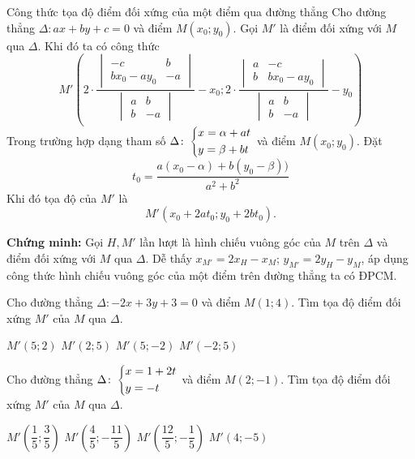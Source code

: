 \begin{dang}{Công thức tọa độ điểm đối xứng của một điểm qua đường thẳng}
Cho đường thẳng $\Delta \colon ax+by+c=0$ và điểm $M\left (x_0;y_0\right )$. Gọi $M'$ là điểm đối xứng với $M$  qua $\Delta$. Khi đó ta có công thức \[M' \left( 2 \cdot \dfrac{\begin{vmatrix}
-c & b  \\ 
bx_0-ay_0 & -a 
\end{vmatrix}}{\begin{vmatrix}
a & b  \\ 
b & -a 
\end{vmatrix}} -x_0; 2 \cdot \dfrac{\begin{vmatrix}
a & -c  \\ 
b & bx_0-ay_0
\end{vmatrix}}{\begin{vmatrix}
a & b  \\ 
b & -a 
\end{vmatrix}} -y_0\right)\]
Trong trường hợp dạng tham số $\Delta \colon \left\{\begin{aligned}&x=\alpha + at\\&y=\beta +bt\end{aligned}\right.$ và điểm $M\left (x_0;y_0\right )$. Đặt \[t_0 =\dfrac{a(x_0-\alpha) + b(y_0-\beta))}{a^2+b^2}\] 
Khi đó tọa độ của $M'$ là 
\[ M'(x_0+2at_0; y_0+2bt_0).\]
\end{dang}
\noindent \textbf{Chứng minh:} Gọi $H,M'$ lần lượt là hình chiếu vuông góc của $M$ trên $\Delta$  và điểm đối xứng với $M$ qua $\Delta$. Dễ thấy $x_{M'} = 2x_H-x_M$; $y_{M'} = 2y_H-y_M$, áp dụng công thức hình chiếu vuông góc của một điểm trên đường thẳng ta có ĐPCM. 

\begin{vd}%
Cho đường thẳng $\Delta \colon -2x+3y+3=0$ và điểm $M(1;4)$. Tìm tọa độ điểm đối xứng $M'$ của $M$ qua $\Delta.$

\choice
{$M'(5;2)$}
{$M'(2;5)$}
{\True $M'(5;-2)$}
{$M'(-2;5)$}
\end{vd}

\begin{vd}%
Cho đường thẳng $\Delta \colon \left\{\begin{aligned}&x=1+2t\\&y=-t\end{aligned}\right.$ và điểm $M(2;-1)$. Tìm tọa độ điểm đối xứng $M'$ của $M$ qua $\Delta.$

\choice
{$M'\left (\dfrac{1}{5};\dfrac{3}{5}\right )$}
{$M'\left (\dfrac{4}{5};-\dfrac{11}{5}\right )$}
{\True $M'\left (\dfrac{12}{5};-\dfrac{1}{5}\right )$}
{$M'(4;-5)$}
\end{vd}


